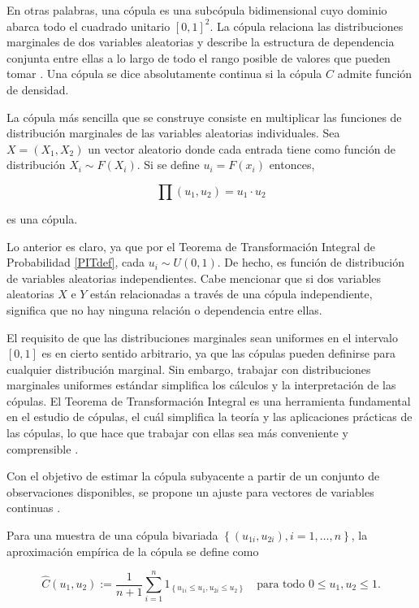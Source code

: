 En otras palabras, una cópula es una subcópula bidimensional cuyo dominio abarca todo el cuadrado unitario $[0, 1]^2$. La cópula relaciona las distribuciones marginales de dos variables aleatorias y describe la estructura de dependencia conjunta entre ellas a lo largo de todo el rango posible de valores que pueden tomar \cite{nelsenintroduction}. Una cópula se dice absolutamente continua si la cópula $C$ admite función de densidad.

\begin{ejemplo}
    La cópula más sencilla que se construye consiste en multiplicar las funciones de distribución marginales de las variables aleatorias individuales. Sea $X = (X_1, X_2)$ un vector aleatorio donde cada entrada tiene como función de distribución $X_i \sim F(X_i)$. Si se define $u_i = F(x_i)$ entonces,

    \begin{equation}
         \prod (u_1, u_2) = u_1 \cdot u_2
    \end{equation}

    es una cópula.

    Lo anterior es claro, ya que por el Teorema de Transformación Integral de Probabilidad \ref{PITdef}, cada $u_i \sim U(0, 1)$. De hecho, es función de distribución de variables aleatorias independientes. Cabe mencionar que si dos variables aleatorias $X$ e $Y$ están relacionadas a través de una cópula independiente, significa que no hay ninguna relación o dependencia entre ellas.
\end{ejemplo}

El requisito de que las distribuciones marginales sean uniformes en el intervalo $[0,1]$ es en cierto sentido arbitrario, ya que las cópulas pueden definirse para cualquier distribución marginal. Sin embargo, trabajar con distribuciones marginales uniformes estándar simplifica los cálculos y la interpretación de las cópulas. El Teorema de Transformación Integral es una herramienta fundamental en el estudio de cópulas, el cuál simplifica la teoría y las aplicaciones prácticas de las cópulas, lo que hace que trabajar con ellas sea más conveniente y comprensible \cite{CopulasR}.

Con el objetivo de estimar la cópula subyacente a partir de un conjunto de observaciones disponibles, se propone un ajuste para vectores de variables continuas \cite{CopulasR}.

\begin{defn}
    Para una muestra de una cópula bivariada $\left\{ (u_{1 i}, u_{2 i}), i=1, \ldots, n\right\}$, la aproximación empírica de la cópula se define como

    \begin{equation}
        \hat{C}\left(u_1, u_2\right):=\frac{1}{n+1} \sum_{i=1}^n 1_{\left\{u_{1 i} \leq u_1, u_{2 i} \leq u_2\right\}} \quad \text {para todo } 0 \leq u_1, u_2 \leq 1.
    \end{equation}
\end{defn}

